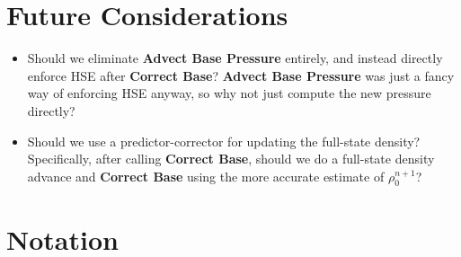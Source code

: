 \section{Future Considerations}

\begin{itemize}
\item Should we eliminate {\bf Advect Base Pressure} entirely, and instead directly
enforce HSE after {\bf Correct Base}?  {\bf Advect Base Pressure} was just a fancy
way of enforcing HSE anyway, so why not just compute the new pressure directly?

\item Should we use a predictor-corrector for updating the full-state density?
Specifically, after calling {\bf Correct Base}, should we do a full-state density 
advance and {\bf Correct Base} using the more accurate estimate of $\rho_0^{n+1}$?

\end{itemize}


\section{Notation}



